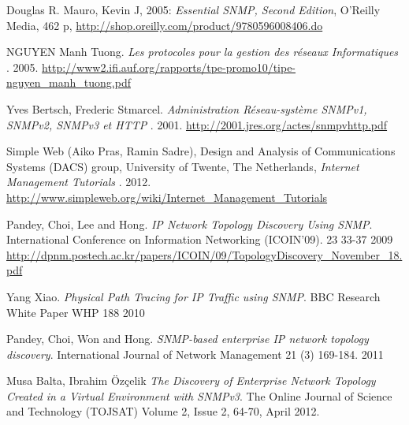 \begin{thebibliography}{9}

  Douglas R. Mauro, Kevin J, 2005:
  \emph{Essential SNMP, Second Edition},
  O'Reilly Media, 462 p,
  \url{http://shop.oreilly.com/product/9780596008406.do}
  
   NGUYEN Manh Tuong.
  \emph{Les protocoles pour la gestion des réseaux Informatiques }.
  2005.
  \url{http://www2.ifi.auf.org/rapports/tpe-promo10/tipe-nguyen_manh_tuong.pdf}
  
   Yves Bertsch, Frederic Stmarcel.
  \emph{Administration Réseau-système SNMPv1, SNMPv2, SNMPv3 et HTTP }.
  2001.
  \url{http://2001.jres.org/actes/snmpvhttp.pdf}
  
   Simple Web (Aiko Pras, Ramin Sadre), Design and Analysis of Communications Systems (DACS) group, University of Twente, The Netherlands, 
  \emph{Internet Management Tutorials }.
  2012.
  \url{http://www.simpleweb.org/wiki/Internet_Management_Tutorials}
  
    
  
  

Pandey, Choi, Lee and Hong.
\emph{IP Network Topology Discovery Using SNMP}. 
International Conference on Information Networking (ICOIN'09). 23 33-37 2009
  \url{http://dpnm.postech.ac.kr/papers/ICOIN/09/TopologyDiscovery_November_18.pdf}

Yang Xiao.
\emph{Physical Path Tracing for IP Traffic using SNMP}. 
BBC Research White Paper WHP 188 2010

Pandey, Choi, Won and Hong.
\emph{SNMP-based enterprise IP network topology discovery}. 
 International Journal of Network Management 21 (3) 169-184. 2011
 
Musa Balta, Ibrahim Özçelik
\emph{The Discovery of Enterprise Network Topology Created in a Virtual
Environment with SNMPv3}. 
The Online Journal of Science and Technology (TOJSAT) Volume 2, Issue 2, 64-70, April 2012.



\end{thebibliography}
